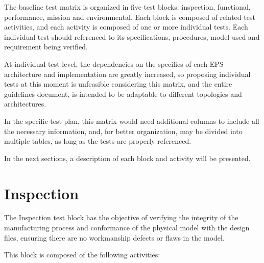 The baseline test matrix is organized in five test blocks: inspection, functional, performance, mission and environmental.
Each block is composed of related test activities, and each activity is composed of one or more individual tests.
Each individual test should referenced to its specifications, procedures, model used and requirement being verified.

At individual test level, the dependencies on the specifics of each EPS architecture and implementation are greatly increased, so proposing individual tests at this moment is unfeasible considering this matrix, and the entire guidelines document, is intended to be adaptable to different topologies and architectures.

In the specific test plan, this matrix would need additional columns to include all the necessary information, and, for better organization, may be divided into multiple tables, as long as the tests are properly referenced.

In the next sections, a description of each block and activity will be presented.



\section{Inspection}

The Inspection test block has the objective of verifying the integrity of the manufacturing process and conformance of the physical model with the design files, ensuring there are no workmanship defects or flaws in the model.

This block is composed of the following activities:

